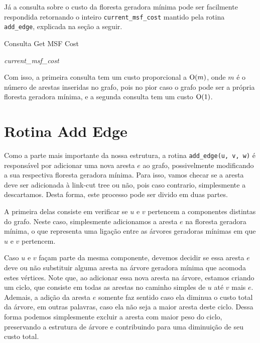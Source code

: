 Já a consulta sobre o custo da floresta geradora mínima pode ser facilmente respondida retornando o inteiro \texttt{current\_msf\_cost} mantido pela rotina \texttt{add\_edge}, explicada na seção a seguir.

\begin{algorithm}[h!]
    \caption{Consulta Get MSF Cost}\label{imsf-get-msf-cost}
    \begin{algorithmic}
        \State \Return \emph{current\_msf\_cost}
        \EndFunction
    \end{algorithmic}
\end{algorithm}

Com isso, a primeira consulta tem um custo proporcional a $\mathrm{O}(m)$, onde $m$ é o número de arestas inseridas no grafo, pois no pior caso o grafo pode ser a própria floresta geradora mínima, e a segunda consulta tem um custo $\mathrm{O}(1)$.

\section{Rotina Add Edge}
\label{sec:imsf-add-edge}

Como a parte mais importante da nossa estrutura, a rotina \texttt{add\_edge(u, v, w)} é responsável por adicionar uma nova aresta $e$ ao grafo, possivelmente modificando a sua respectiva floresta geradora mínima. Para isso, vamos checar se a aresta deve ser adicionada à link-cut tree ou não, pois caso contrario, simplesmente a descartamos. Desta forma, este processo pode ser divido em duas partes.

A primeira delas consiste em verificar se $u$ e $v$ pertencem a componentes distintas do grafo. Neste caso, simplesmente adicionamos a aresta $e$ na floresta geradora mínima, o que representa uma ligação entre as árvores geradoras mínimas em que $u$ e $v$ pertencem.

Caso $u$ e $v$ façam parte da mesma componente, devemos decidir se essa aresta $e$ deve ou não substituir alguma aresta na árvore geradora mínima que acomoda estes vértices. Note que, ao adicionar essa nova aresta na árvore, estamos criando um ciclo, que consiste em todas as arestas no caminho simples de $u$ até $v$ mais $e$. Ademais, a adição da aresta $e$ somente faz sentido caso ela diminua o custo total da árvore, em outras palavras, caso ela não seja a maior aresta deste ciclo. Dessa forma podemos simplesmente excluir a aresta com maior peso do ciclo, preservando a estrutura de árvore e contribuindo para uma diminuição de seu custo total.

